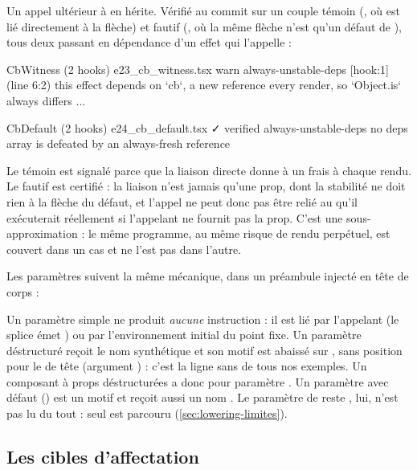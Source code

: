 Un appel ultérieur à  en hérite. Vérifié au commit \snapshotCommit{} sur un couple témoin (, où  est lié directement à la flèche) et fautif (, où la même flèche n'est qu'un défaut de ), tous deux passant  en dépendance d'un effet qui l'appelle :

\begin{sortie}
  CbWitness  (2 hooks)  e23_cb_witness.tsx
    warn   always-unstable-deps  [hook:1]  (line 6:2)  this effect depends on `cb`,
      a new reference every render, so `Object.is` always differs ...

  CbDefault  (2 hooks)  e24_cb_default.tsx  ✓
    verified  always-unstable-deps  no deps array is defeated by an always-fresh reference
\end{sortie}

Le témoin est signalé parce que la liaison directe donne à  un  frais à chaque rendu. Le fautif est certifié : la liaison  n'est jamais qu'une prop, dont la stabilité ne doit rien à la flèche du défaut, et l'appel  ne peut donc pas être relié au  qu'il exécuterait réellement si l'appelant ne fournit pas la prop. C'est une sous-approximation : le même programme, au même risque de rendu perpétuel, est couvert dans un cas et ne l'est pas dans l'autre.

Les paramètres suivent la même mécanique, dans un préambule injecté en tête de corps :


Un paramètre simple  ne produit \emph{aucune} instruction : il est lié par l'appelant (le splice émet ) ou par l'environnement initial du point fixe. Un paramètre déstructuré reçoit le nom synthétique  et son motif est abaissé sur , sans position pour le  de tête (argument ) : c'est la ligne  sans  de tous nos exemples. Un composant à props déstructurées a donc pour paramètre . Un paramètre avec défaut () est un motif et reçoit aussi un nom . Le paramètre de reste , lui, n'est pas lu du tout : seul  est parcouru (\cref{sec:lowering-limites}).

\subsection{Les cibles d'affectation}

